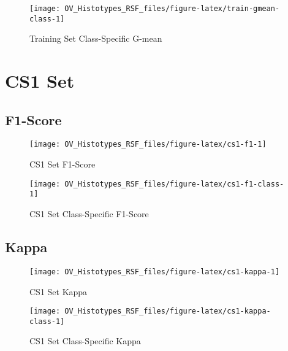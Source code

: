 \documentclass[
]{report}
\begin{document}
\begin{figure}[H]

{\centering \texttt{[image: OV\_Histotypes\_RSF\_files/figure-latex/train-gmean-class-1]} 

}

\caption{Training Set Class-Specific G-mean}\label{fig:train-gmean-class}
\end{figure}

\hypertarget{cs1-set}{%
\section{CS1 Set}\label{cs1-set}}

\hypertarget{f1-score-1}{%
\subsection{F1-Score}\label{f1-score-1}}

\begin{figure}[H]

{\centering \texttt{[image: OV\_Histotypes\_RSF\_files/figure-latex/cs1-f1-1]} 

}

\caption{CS1 Set F1-Score}\label{fig:cs1-f1}
\end{figure}

\begin{figure}[H]

{\centering \texttt{[image: OV\_Histotypes\_RSF\_files/figure-latex/cs1-f1-class-1]} 

}

\caption{CS1 Set Class-Specific F1-Score}\label{fig:cs1-f1-class}
\end{figure}

\hypertarget{kappa-1}{%
\subsection{Kappa}\label{kappa-1}}

\begin{figure}[H]

{\centering \texttt{[image: OV\_Histotypes\_RSF\_files/figure-latex/cs1-kappa-1]} 

}

\caption{CS1 Set Kappa}\label{fig:cs1-kappa}
\end{figure}

\begin{figure}[H]

{\centering \texttt{[image: OV\_Histotypes\_RSF\_files/figure-latex/cs1-kappa-class-1]} 

}

\caption{CS1 Set Class-Specific Kappa}\label{fig:cs1-kappa-class}
\end{figure}
\end{document}
